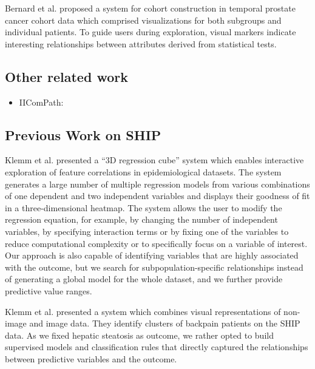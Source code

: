 \documentclass[
  oneside]{book}
\providecommand{\tightlist}{%
  \setlength{\itemsep}{0pt}\setlength{\parskip}{0pt}}
\begin{document}
Bernard et al. \autocite{bernard2015visual} proposed a system for cohort construction in temporal prostate cancer cohort data which comprised visualizations for both subgroups and individual patients.
To guide users during exploration, visual markers indicate interesting relationships between attributes derived from statistical tests.

\hypertarget{other-related-work}{%
\subsection{Other related work}\label{other-related-work}}

\begin{itemize}
\tightlist
\item
  IIComPath: \autocite{Corvo2020}
\end{itemize}

\hypertarget{previous-work-on-ship}{%
\subsection{Previous Work on SHIP}\label{previous-work-on-ship}}

Klemm et al. \autocite{Klemm:RegressionHeatmap2015} presented a ``3D regression cube'' system which enables interactive exploration of feature correlations in epidemiological datasets.
The system generates a large number of multiple regression models from various combinations of one dependent and two independent variables and displays their goodness of fit in a three-dimensional heatmap.
The system allows the user to modify the regression equation, for example, by changing the number of independent variables, by specifying interaction terms or by fixing one of the variables to reduce computational complexity or to specifically focus on a variable of interest.
Our approach is also capable of identifying variables that are highly associated with the outcome, but we search for subpopulation-specific relationships instead of generating a global model for the whole dataset, and we further provide predictive value ranges.

Klemm et al. \autocite{Klemm14} presented a system which combines visual representations of non-image and image data.
They identify clusters of backpain patients on the SHIP data.
As we fixed hepatic steatosis as outcome, we rather opted to build supervised models and classification rules that directly captured the relationships between predictive variables and the outcome.
\end{document}
